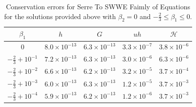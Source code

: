 \documentclass[10pt]{article}
\newcommand\T{\rule{0pt}{5ex }}       %
\begin{document}
\begin{table}
	\centering
	\begin{tabular}{ c | c | c | c | c }
		$\beta_1$ & $h$ & $G$ & $uh$ & $\mathcal{H}$  \\
		\hline
		\T $0$ &	$8.0 \times 10^{-13}$ &	$6.3 \times 10^{-13}$ & $3.3 \times 10^{-7}$ & $3.8 \times 10^{-6}$ \\
		\T $-\frac{2}{3} + 10^{-1}$ &	$7.2 \times 10^{-13}$ &	$6.3 \times 10^{-13}$ & $3.0 \times 10^{-6}$ & $6.3 \times 10^{-6}$ \\
		\T $-\frac{2}{3} + 10^{-2}$ &	$6.6 \times 10^{-13}$ &	$6.2 \times 10^{-13}$ & $3.2 \times 10^{-5}$ & $3.7 \times 10^{-4}$ \\		
		\T $-\frac{2}{3} + 10^{-3}$ &	$6.0 \times 10^{-13}$ &	$6.3 \times 10^{-13}$ & $1.2 \times 10^{-5}$ & $3.7 \times 10^{-3}$ \\	
		\T $-\frac{2}{3} + 10^{-4}$ &	$5.9 \times 10^{-13}$ &	$6.2 \times 10^{-13}$ & $1.2 \times 10^{-6}$ & $3.7 \times 10^{-3}$ 		
	\end{tabular}
	\caption{Conservation errors for Serre To SWWE Faimly of Equations for the solutions provided above with $\beta_2 = 0$ and $-\frac{2}{3}\le \beta_1 \le 0$.}
\end{table}
\end{document}
